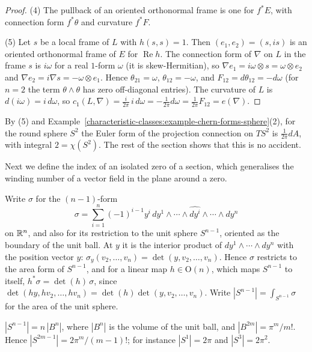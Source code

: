 \begin{proof}
(4) The pullback of an oriented orthonormal frame is one for $f^*E$, with connection form $f^*\theta$ and curvature $f^*F$.

(5) Let $s$ be a local frame of $L$ with $h(s, s) = 1$. Then $(e_1, e_2) = (s, is)$ is an oriented orthonormal frame of $E$ for $\operatorname{Re}h$. The connection form of $\nabla$ on $L$ in
the frame $s$ is $i\omega$ for a real $1$-form $\omega$ (it is skew-Hermitian), so $\nabla e_1 = i\omega \otimes s = \omega \otimes e_2$ and $\nabla e_2 = i\nabla s = -\omega \otimes e_1$. Hence
$\theta_{21} = \omega$, $\theta_{12} = -\omega$, and $F_{12} = d\theta_{12} = -d\omega$ (for $n = 2$ the term $\theta \wedge \theta$ has zero off-diagonal entries). The curvature of $L$ is
$d(i\omega) = i\,d\omega$, so $c_1(L, \nabla) = \frac{i}{2\pi}\,i\,d\omega = -\frac{1}{2\pi}d\omega = \frac{1}{2\pi}F_{12} = e(\nabla)$.
\end{proof}

By (5) and Example~\ref{characteristic-classes:example-chern-forms-sphere}(2), for the round sphere $S^2$ the Euler form of the projection connection on $TS^2$ is $\frac{1}{2\pi}dA$, with
integral $2 = \chi(S^2)$. The rest of the section shows that this is no accident.

Next we define the index of an isolated zero of a section, which generalises the winding number of a vector field in the plane around a zero.

Write $\sigma$ for the $(n-1)$-form
\[
\sigma = \sum_{i=1}^n(-1)^{i-1}y^i\,dy^1 \wedge \cdots \wedge \widehat{dy^i} \wedge \cdots \wedge dy^n
\]
on $\mathbb{R}^n$, and also for its restriction to the unit sphere $S^{n-1}$, oriented as the boundary of the unit ball. At $y$ it is the interior product of $dy^1 \wedge \cdots \wedge dy^n$ with
the position vector $y$: $\sigma_y(v_2, \ldots, v_n) = \det(y, v_2, \ldots, v_n)$. Hence $\sigma$ restricts to the area form of $S^{n-1}$, and for a linear map $h \in \mathrm{O}(n)$, which maps
$S^{n-1}$ to itself, $h^*\sigma = \det(h)\,\sigma$, since $\det(hy, hv_2, \ldots, hv_n) = \det(h)\det(y, v_2, \ldots, v_n)$. Write $|S^{n-1}| = \int_{S^{n-1}}\sigma$ for the area of the unit sphere.

\begin{lemma}\label{characteristic-classes:lemma-sphere-area}
$|S^{n-1}| = n\,|B^n|$, where $|B^n|$ is the volume of the unit ball, and $|B^{2m}| = \pi^m/m!$. Hence $|S^{2m-1}| = 2\pi^m/(m-1)!$; for instance $|S^1| = 2\pi$ and $|S^3| = 2\pi^2$.
\end{lemma}


